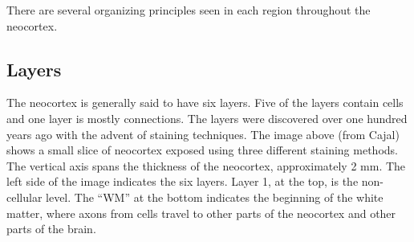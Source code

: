 \documentclass{report}
\begin{document}
There are several organizing principles seen in each region throughout
the neocortex.

\begin{figure}
\end{figure}

\subsection*{Layers}
The neocortex is generally said to have six layers. Five of the layers
contain cells and one layer is mostly connections. The layers were
discovered over one hundred years ago with the advent of staining
techniques. The image above (from Cajal) shows a small slice of
neocortex exposed using three different staining methods. The vertical
axis spans the thickness of the neocortex, approximately 2 mm. The
left side of the image indicates the six layers. Layer 1, at the top,
is the non-cellular level. The ``WM'' at the bottom indicates the
beginning of the white matter, where axons from cells travel to other
parts of the neocortex and other parts of the brain.
\end{document}

